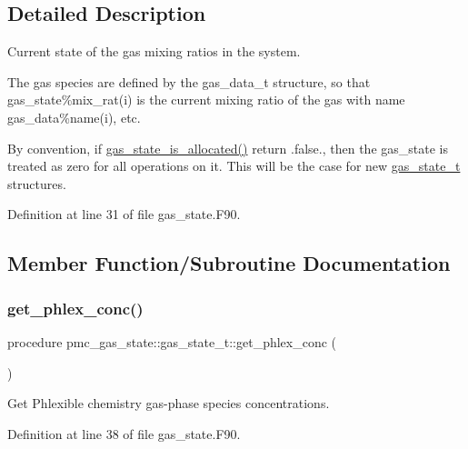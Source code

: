 \subsection{Detailed Description}
Current state of the gas mixing ratios in the system. 

The gas species are defined by the gas\+\_\+data\+\_\+t structure, so that {\ttfamily gas\+\_\+state\%mix\+\_\+rat}(i) is the current mixing ratio of the gas with name {\ttfamily gas\+\_\+data\%name}(i), etc.

By convention, if \mbox{\hyperlink{namespacepmc__gas__state_a589f5022a3cc8311ce829f31b8f4f641}{gas\+\_\+state\+\_\+is\+\_\+allocated()}} return {\ttfamily }.false., then the gas\+\_\+state is treated as zero for all operations on it. This will be the case for new {\ttfamily \mbox{\hyperlink{structpmc__gas__state_1_1gas__state__t}{gas\+\_\+state\+\_\+t}}} structures. 

Definition at line 31 of file gas\+\_\+state.\+F90.



\subsection{Member Function/\+Subroutine Documentation}
\mbox{\label{structpmc__gas__state_1_1gas__state__t_a55b6048e16efa6da29cb99d7796abec8}} 
\subsubsection{\texorpdfstring{get\+\_\+phlex\+\_\+conc()}{get\_phlex\_conc()}}
{\footnotesize\ttfamily procedure pmc\+\_\+gas\+\_\+state\+::gas\+\_\+state\+\_\+t\+::get\+\_\+phlex\+\_\+conc (\begin{DoxyParamCaption}{ }\end{DoxyParamCaption})}



Get Phlexible chemistry gas-\/phase species concentrations. 



Definition at line 38 of file gas\+\_\+state.\+F90.

